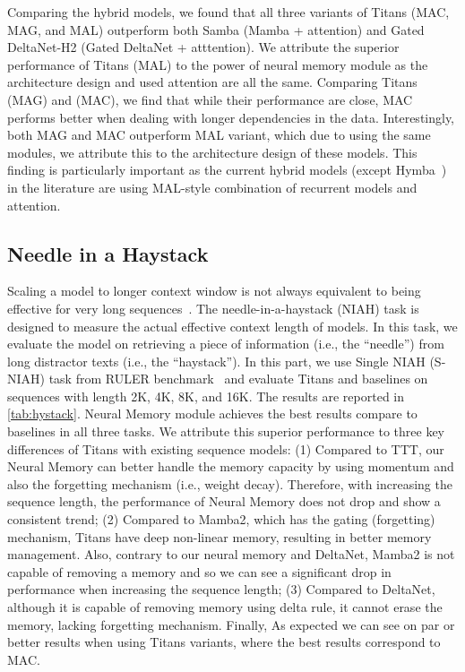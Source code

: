 Comparing the hybrid models, we found that all three variants of Titans (MAC, MAG, and MAL) outperform both Samba (Mamba + attention) and Gated DeltaNet-H2 (Gated DeltaNet + atttention). We attribute the superior performance of Titans (MAL) to the power of neural memory module as the architecture design and used attention are all the same. Comparing Titans (MAG) and (MAC), we find that while their performance are close, MAC performs better when dealing with longer dependencies in the data. Interestingly, both MAG and MAC outperform MAL variant, which due to using the same modules, we attribute this to the architecture design of these models. This finding is particularly important as the current hybrid models (except Hymba~\citep{dong2024hymba}) in the literature are using MAL-style combination of recurrent models and attention. 





\subsection{Needle in a Haystack}\label{sec:exp-hystack}
Scaling a model to longer context window is not always equivalent to being effective for very long sequences~\citep{hsieh2024ruler}. The needle-in-a-haystack (NIAH) task is designed to measure the actual effective context length of models. In this task, we evaluate the model on retrieving a piece of information (i.e., the ``needle'') from long distractor texts (i.e., the ``haystack''). In this part, we use Single NIAH (S-NIAH) task from RULER benchmark~\citep{hsieh2024ruler} and evaluate Titans and baselines on sequences with length 2K, 4K, 8K, and 16K. The results are reported in \autoref{tab:hystack}. Neural Memory module achieves the best results compare to baselines in all three tasks. We attribute this superior performance to three key differences of Titans with existing sequence models: (1) Compared to TTT, our Neural Memory can better handle the memory capacity by using momentum and also the forgetting mechanism (i.e., weight decay). Therefore, with increasing the sequence length, the performance of Neural Memory does not drop and show a consistent trend; (2) Compared to Mamba2, which has the gating (forgetting) mechanism, Titans have deep non-linear memory, resulting in better memory management. Also, contrary to our neural memory and DeltaNet, Mamba2 is not capable of removing a memory and so we can see a significant drop in performance when increasing the sequence length; (3) Compared to DeltaNet, although it is capable of removing memory using delta rule, it cannot erase the memory, lacking forgetting mechanism. Finally, As expected we can see on par or better results when using Titans variants, where the best results correspond to MAC.  




